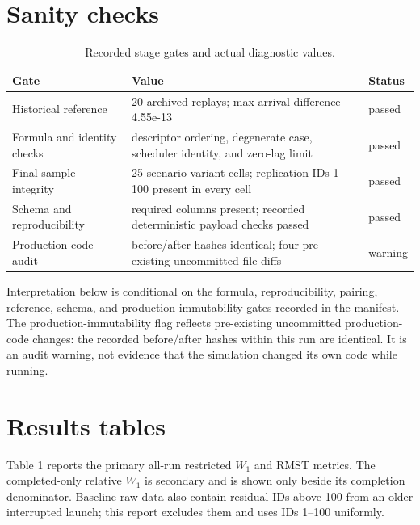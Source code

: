 \documentclass[11pt]{article}
\begin{document}
\section{Sanity checks}
\begin{table}[H]\centering
\caption{Recorded stage gates and actual diagnostic values.}
\begin{tabular}{p{.24\linewidth}p{.58\linewidth}p{.12\linewidth}}\toprule Gate & Value & Status \\\midrule
Historical reference & 20 archived replays; max arrival difference 4.55e-13 & passed \\ 
Formula and identity checks & descriptor ordering, degenerate case, scheduler identity, and zero-lag limit & passed \\ 
Final-sample integrity & 25 scenario-variant cells; replication IDs 1--100 present in every cell & passed \\ 
Schema and reproducibility & required columns present; recorded deterministic payload checks passed & passed \\ 
Production-code audit & before/after hashes identical; four pre-existing uncommitted file diffs & warning \\ 
\bottomrule\end{tabular}\end{table}
Interpretation below is conditional on the formula, reproducibility, pairing,
reference, schema, and production-immutability gates recorded in the manifest.
The production-immutability flag reflects pre-existing uncommitted production-code
changes: the recorded before/after hashes within this run are identical. It is an
audit warning, not evidence that the simulation changed its own code while running.

\section{Results tables}
Table 1 reports the primary all-run restricted $W_1$ and RMST metrics. The
completed-only relative $W_1$ is secondary and is shown only beside its completion
denominator. Baseline raw data also contain residual IDs above 100 from an older
interrupted launch; this report excludes them and uses IDs 1--100 uniformly.

\end{document}
